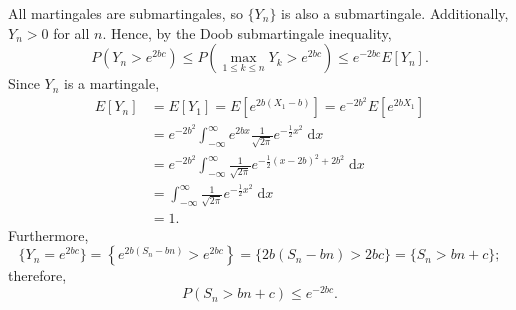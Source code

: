 \documentclass{homework}
\begin{document}
	All martingales are submartingales, so $\{Y_n\}$ is also a submartingale. Additionally, $Y_n > 0$ for all $n$. Hence, by the Doob submartingale inequality,
	\begin{equation*}
		P\left(Y_n > e^{2bc}\right) \le P\left(\max_{1\le k\le n}Y_k > e^{2bc}\right) \le e^{-2bc}E[Y_n].
	\end{equation*}
	Since $Y_n$ is a martingale,
	\begin{align*}
		E[Y_n] &= E[Y_1] = E\left[e^{2b(X_1 - b)}\right] = e^{-2b^2}E\left[e^{2bX_1}\right] \\
		&= e^{-2b^2}\int_{-\infty}^\infty e^{2bx}\frac{1}{\sqrt{2\pi}}e^{-\frac{1}{2}x^2}\;\text{d}x \\
		&= e^{-2b^2}\int_{-\infty}^\infty \frac{1}{\sqrt{2\pi}}e^{-\frac{1}{2}(x-2b)^2 + 2b^2}\;\text{d}x \\
		&= \int_{-\infty}^\infty\frac{1}{\sqrt{2\pi}}e^{-\frac{1}{2}x^2}\;\text{d}x \\
		&= 1.
	\end{align*}
	Furthermore,
	\begin{equation*}
		\{Y_n = e^{2bc}\} = \left\{e^{2b(S_n - bn)} > e^{2bc}\right\} = \{2b(S_n - bn) > 2bc\} = \{S_n > bn + c\};
	\end{equation*}
	therefore,
	\begin{equation*}
		P(S_n > bn +c) \le e^{-2bc}.
	\end{equation*}
	
	\question
\end{document}
